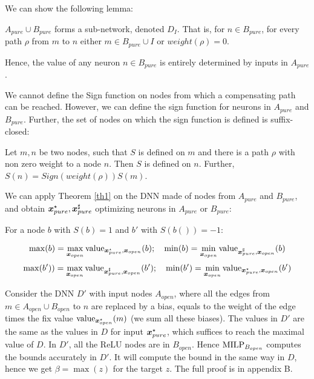 We can show the following lemma:

\begin{lemma}
	$A_{pure} \cup B_{pure} $ forms a sub-network, denoted $D_I$. That is, 
	for $n \in B_{pure}$, for every path $\rho$ from $m$ to $n$
	either $m \in B_{pure}\cup I$ or $weight(\rho)=0$.
\end{lemma}

Hence, the value of any neuron $n \in B_{pure}$ is entirely determined by 
inputs in $A_{pure}$. 


We cannot define the Sign function on nodes from which a compensating path can be reached.
However, we can define the sign function for neurons in $A_{pure}$ and $B_{pure}$.
Further, the set of nodes on which the sign function is defined is suffix-closed:

\begin{lemma}
	Let $m,n$ be two nodes, such that $S$ is defined on $m$ and there is a path $\rho$ with non zero weight to a node $n$. Then $S$ is defined on $n$.
	Further, $S(n)= Sign(weight(\rho)) S(m)$.
\end{lemma}

We can apply Theorem \ref{th1} on the DNN made of nodes from $A_{pure}$ and $B_{pure}$, and obtain $\boldsymbol{x}_{pure}^\star,\boldsymbol{x}_{pure}^\sharp$ optimizing neurons in $A_{pure}$ or $B_{pure}$:

\begin{proposition}
For a node $b$ with $S(b)=1$ and $b'$ with $S(b())=-1$:

$$\max(b)=\max_{\boldsymbol{x}_{open}} {\textrm{value}}_{\boldsymbol{x}^{\star}_{pure},\boldsymbol{x}_{open}}(b); \quad 
\min(b)=\min_{\boldsymbol{x}_{open}} {\textrm{value}}_{\boldsymbol{x}^{\sharp}_{pure},\boldsymbol{x}_{open}}(b)$$
$$\max(b'))=\max_{\boldsymbol{x}_{open}} {\textrm{value}}_{\boldsymbol{x}^{\sharp}_{pure},\boldsymbol{x}_{open}}(b'); \quad \min(b')=\min_{\boldsymbol{x}_{open}} {\textrm{value}}_{\boldsymbol{x}^{\star}_{pure},\boldsymbol{x}_{open}}(b')$$
\end{proposition}

Consider the DNN $D'$ with input nodes $A_{open}$, where all the 
edges from $m \in A_{open} \cup B_{open}$ to $n$ are replaced by a bias, 
equals to the weight of the edge times the fix value ${\textrm{value}}_{\boldsymbol{x}^\star_{open}}(m)$ (we sum all these biases).
The values in $D'$ are the same as the values in $D$ for input $\boldsymbol{x}^{\star}_{pure}$,
which suffices to reach the maximal value of $D$.
In $D'$, all the ReLU nodes are in $B_{open}$. 
Hence ${\textrm{MILP}}_{B_{open}}$ computes the bounds accurately in $D'$.
It will compute the bound in the same way in $D$, hence we get $\beta=\max(z)$ for the target $z$. The full proof is in appendix B.


